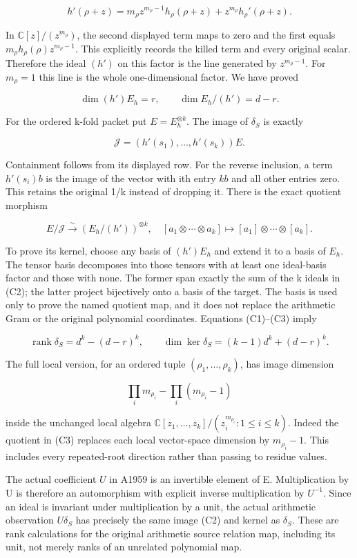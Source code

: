 \[
h'(\rho+z)=m_\rho z^{m_\rho-1}h_\rho(\rho+z)
 +z^{m_\rho}h_\rho'(\rho+z).
\]

In \(\mathbb C[z]/(z^{m_\rho})\), the second displayed term maps to zero and the first equals \(m_\rho h_\rho(\rho)z^{m_\rho-1}\). This explicitly records the killed term and every original scalar. Therefore the ideal \((h')\) on this factor is the line generated by \(z^{m_\rho-1}\). For \(m_\rho=1\) this line is the whole one-dimensional factor. We have proved

\[
\dim(h')E_h=r,\qquad
\dim E_h/(h')=d-r.
\tag{C1}
\]

For the ordered k-fold packet put \(E=E_h^{\otimes k}\). The image of \(\delta_S\) is exactly

\[
\mathcal J=(h'(s_1),\ldots,h'(s_k))E.
\tag{C2}
\]

Containment follows from its displayed row. For the reverse inclusion, a term \(h'(s_i)b\) is the image of the vector with ith entry \(kb\) and all other entries zero. This retains the original 1/k instead of dropping it. There is the exact quotient morphism

\[
E/\mathcal J\xrightarrow{\sim}(E_h/(h'))^{\otimes k},
\quad [a_1\otimes\cdots\otimes a_k]\longmapsto
[a_1]\otimes\cdots\otimes[a_k].
\tag{C3}
\]

To prove its kernel, choose any basis of \((h')E_h\) and extend it to a basis of \(E_h\). The tensor basis decomposes into those tensors with at least one ideal-basis factor and those with none. The former span exactly the sum of the k ideals in (C2); the latter project bijectively onto a basis of the target. The basis is used only to prove the named quotient map, and it does not replace the arithmetic Gram or the original polynomial coordinates. Equations (C1)--(C3) imply

\[
\operatorname{rank}\delta_S=d^k-(d-r)^k,
\qquad
\dim\ker\delta_S=(k-1)d^k+(d-r)^k.
\tag{C4}
\]

The full local version, for an ordered tuple \((\rho_1,\ldots,\rho_k)\), has image dimension

\[
\prod_i m_{\rho_i}-\prod_i(m_{\rho_i}-1)
\tag{C5}
\]

inside the unchanged local algebra \(\mathbb C[z_1,\ldots,z_k]/(z_i^{m_{\rho_i}}:1\le i\le k)\). Indeed the quotient in (C3) replaces each local vector-space dimension by \(m_{\rho_i}-1\). This includes every repeated-root direction rather than passing to residue values.

The actual coefficient \(U\) in A1959 is an invertible element of E. Multiplication by U is therefore an automorphism with explicit inverse multiplication by \(U^{-1}\). Since an ideal is invariant under multiplication by a unit, the actual arithmetic observation \(U\delta_S\) has precisely the same image (C2) and kernel as \(\delta_S\). These are rank calculations for the original arithmetic source relation map, including its unit, not merely ranks of an unrelated polynomial map.

